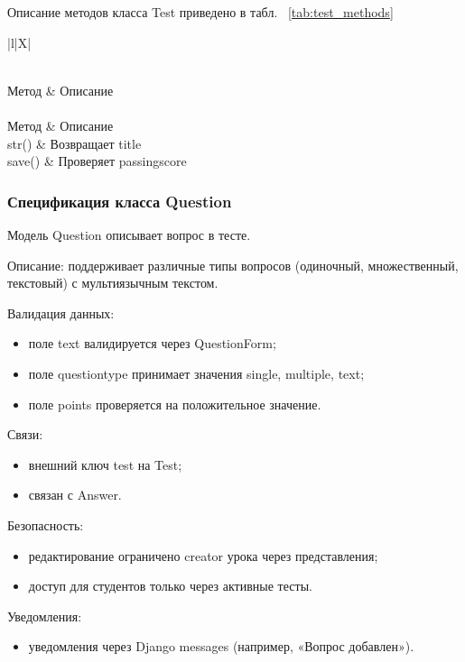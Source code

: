Описание методов класса Test приведено в табл. ~\ref {tab:test_methods}

\begin{xltabular}{\textwidth}{|l|X|}
	\caption{Методы класса Test\label{tab:test_methods}}\\
	\hline
	Метод & Описание \\ \hline
	\endfirsthead
	\\
	\hline
	Метод & Описание \\ \hline
	\endhead
	str() & Возвращает title \\ \hline
	save() & Проверяет passingscore \\ \hline
\end{xltabular}

\subsubsection{Спецификация класса Question}

Модель Question описывает вопрос в тесте.


Описание: поддерживает различные типы вопросов (одиночный, множественный, текстовый) с мультиязычным текстом.

Валидация данных:
	\begin{itemize}
		\item поле text валидируется через QuestionForm;
		\item поле questiontype принимает значения single, multiple, text;
		\item поле points проверяется на положительное значение.
	\end{itemize}
	
Связи:
	\begin{itemize}
		\item внешний ключ test на Test;
		\item связан с Answer.
	\end{itemize}
	
Безопасность:
	\begin{itemize}
		\item редактирование ограничено creator урока через представления;
		\item доступ для студентов только через активные тесты.
	\end{itemize}
	
Уведомления:
	\begin{itemize}
		\item уведомления через Django messages (например, «Вопрос добавлен»).
	\end{itemize}
	
